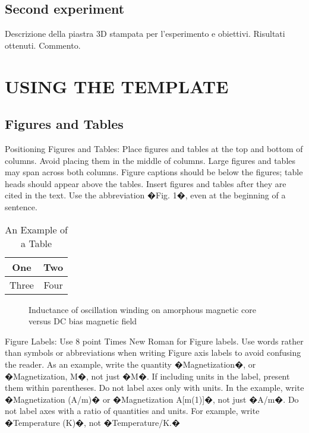 \documentclass[letterpaper, 10 pt, conference]{ieeeconf}  %
\begin{document}
\subsection{Second experiment}

Descrizione della piastra 3D stampata per l'esperimento e obiettivi.
Risultati ottenuti.
Commento.


\section{USING THE TEMPLATE}

\subsection{Figures and Tables}

Positioning Figures and Tables: Place figures and tables at the top and bottom of columns. Avoid placing them in the middle of columns. Large figures and tables may span across both columns. Figure captions should be below the figures; table heads should appear above the tables. Insert figures and tables after they are cited in the text. Use the abbreviation �Fig. 1�, even at the beginning of a sentence.

\begin{table}[h]
\caption{An Example of a Table}
\label{table_example}
\begin{center}
\begin{tabular}{|c||c|}
\hline
One & Two\\
\hline
Three & Four\\
\hline
\end{tabular}
\end{center}
\end{table}


   \begin{figure}[thpb]
      \centering
      \caption{Inductance of oscillation winding on amorphous
       magnetic core versus DC bias magnetic field}
      \label{figurelabel}
   \end{figure}
   

Figure Labels: Use 8 point Times New Roman for Figure labels. Use words rather than symbols or abbreviations when writing Figure axis labels to avoid confusing the reader. As an example, write the quantity �Magnetization�, or �Magnetization, M�, not just �M�. If including units in the label, present them within parentheses. Do not label axes only with units. In the example, write �Magnetization (A/m)� or �Magnetization {A[m(1)]}�, not just �A/m�. Do not label axes with a ratio of quantities and units. For example, write �Temperature (K)�, not �Temperature/K.�
\end{document}
